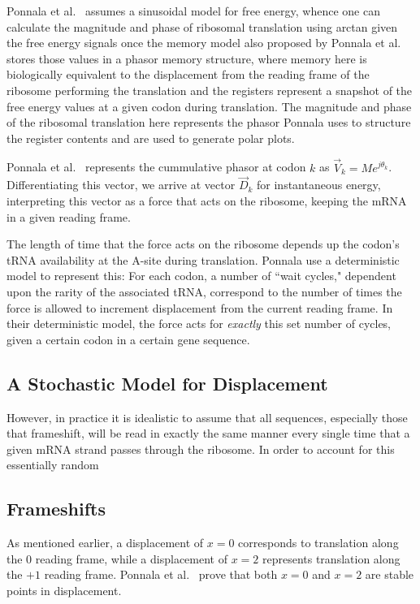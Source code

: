 \documentclass[12pt]{article}
\begin{document}
Ponnala et al.~\cite{lalit:mechanics} assumes a sinusoidal model for free energy, whence one can calculate
the magnitude and phase of ribosomal translation using arctan given the free energy signals once the memory model
also proposed by Ponnala et al. stores those values in a phasor memory structure,
where memory here is biologically equivalent to the displacement from the reading frame of the ribosome performing the translation
and the registers represent a snapshot of the free energy values at a given codon during translation. The magnitude and phase
of the ribosomal translation here represents the phasor Ponnala uses to structure the register contents and are used to generate
polar plots.

Ponnala et al.~\cite{lalit:embs} represents the cummulative phasor at codon $k$ as $\vec{V}_k = Me^{j\theta_k}$.
Differentiating this vector, we arrive at vector $\vec{D}_k$ for instantaneous energy, interpreting this
vector as a force that acts on the ribosome, keeping the mRNA in a given reading frame.

The length of time that the force acts on the ribosome depends up the codon's tRNA availability at the A-site during translation.
Ponnala use a deterministic model to represent this: For each codon, a number
of ``wait cycles," dependent upon the rarity of the associated tRNA, correspond to the number
of times the force is allowed to increment displacement from the current reading frame.
In their deterministic model, the force acts for \emph{exactly} this set number of cycles, given a certain codon in a certain gene sequence.

\subsection{A Stochastic Model for Displacement}

However, in practice it is idealistic to assume that all sequences, especially those that frameshift, will be read in exactly the same manner every single time that a given mRNA strand passes through the ribosome.  In order to account for this essentially random 

\subsection{Frameshifts}


As mentioned earlier, a displacement of $x = 0$ corresponds to translation along the 0 reading frame,
while a displacement of $x = 2$ represents translation along the $+1$ reading frame.
Ponnala et al.~\cite{lalit:embs} prove that both $x = 0$ and $x = 2$ are stable points in displacement.
\end{document}
